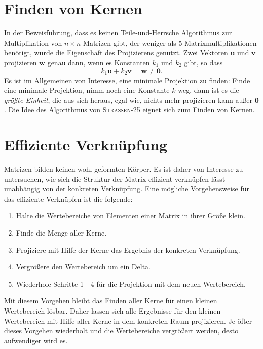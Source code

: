 \documentclass{report}
\numberwithin{equation}{section}
\begin{document}
\section{Finden von Kernen}
In der Beweisführung, dass es keinen Teile-und-Herrsche Algorithmus zur Multiplikation von $n \times n$ Matrizen gibt, der weniger als 5 Matrixmultiplikationen benötigt, wurde die Eigenschaft des Projizierens genutzt. Zwei Vektoren $\boldsymbol{u}$ und $\boldsymbol{v}$ projizieren $\boldsymbol{w}$ genau dann, wenn es Konstanten $k_1$ und $k_2$ gibt, so dass $$k_1 \boldsymbol{u} + k_2\boldsymbol{v} = \boldsymbol{w} \neq \boldsymbol{0}.$$ Es ist im Allgemeinen von Interesse, eine minimale Projektion zu finden: Finde eine minimale Projektion, nimm noch eine Konstante $k$ weg, dann ist es die \textit{größte Einheit}, die aus sich heraus, egal wie, nichts mehr projizieren kann außer $\boldsymbol{0}$. Die Idee des Algorithmus von \textsc{Strassen-25} eignet sich zum Finden von Kernen.

\section{Effiziente Verknüpfung}
Matrizen bilden keinen wohl geformten Körper. Es ist daher von Interesse zu untersuchen, wie sich die Struktur der Matrix effizient verknüpfen lässt unabhängig von der konkreten Verknüpfung. Eine mögliche Vorgehensweise für das effiziente Verknüpfen ist die folgende: 
\begin{enumerate}
	\item Halte die Wertebereiche von Elementen einer Matrix in ihrer Größe klein.
	\item Finde die Menge aller Kerne.
	\item Projiziere mit Hilfe der Kerne das Ergebnis der konkreten Verknüpfung.
	\item Vergrößere den Wertebereich um ein Delta.
	\item Wiederhole Schritte 1 - 4 für die Projektion mit dem neuen Wertebereich.
\end{enumerate}
Mit diesem Vorgehen bleibt das Finden aller Kerne für einen kleinen Wertebereich lösbar. Daher lassen sich alle Ergebnisse für den kleinen Wertebereich mit Hilfe aller Kerne in dem konkreten Raum projizieren. Je öfter dieses Vorgehen wiederholt und die Wertebereiche vergrößert werden, desto aufwendiger wird es.
\end{document}
